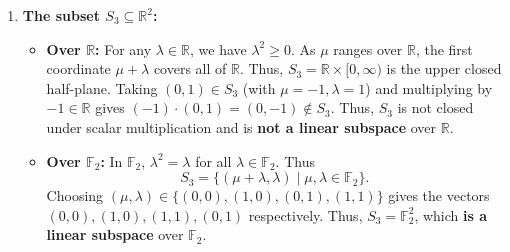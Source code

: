 \begin{exercisesolution*}
\begin{enumerate}[label=\textbf{(\alph*)}]
    \item \textbf{The subset $S_3 \subseteq \mathbb{R}^2$:}
    \begin{itemize}
        \item \textbf{Over $\mathbb{R}$:} For any $\lambda \in \mathbb{R}$, we have $\lambda^2 \ge 0$. As $\mu$ ranges over $\mathbb{R}$, the first coordinate $\mu + \lambda$ covers all of $\mathbb{R}$. Thus, $S_3 = \mathbb{R} \times [0, \infty)$ is the upper closed half-plane.
        Taking $(0, 1) \in S_3$ (with $\mu = -1, \lambda = 1$) and multiplying by $-1 \in \mathbb{R}$ gives $(-1) \cdot (0, 1) = (0, -1) \notin S_3$. Thus, $S_3$ is not closed under scalar multiplication and is \textbf{not a linear subspace} over $\mathbb{R}$.
        \item \textbf{Over $\mathbb{F}_2$:} In $\mathbb{F}_2$, $\lambda^2 = \lambda$ for all $\lambda \in \mathbb{F}_2$. Thus
        \[
        S_3 = \{(\mu + \lambda, \lambda) \mid \mu, \lambda \in \mathbb{F}_2\}.
        \]
        Choosing $(\mu, \lambda) \in \{(0,0), (1,0), (0,1), (1,1)\}$ gives the vectors $(0,0), (1,0), (1,1), (0,1)$ respectively. Thus, $S_3 = \mathbb{F}_2^2$, which \textbf{is a linear subspace} over $\mathbb{F}_2$.
    \end{itemize}
\end{enumerate}
\end{exercisesolution*}

